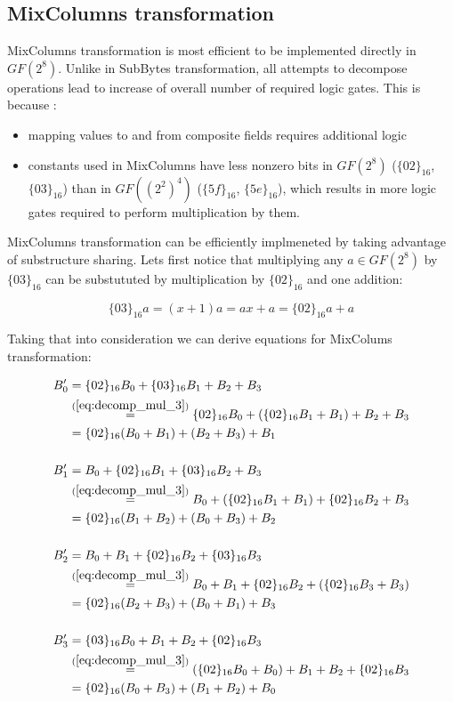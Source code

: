 \subsection{MixColumns transformation}

MixColumns transformation is most efficient to be implemented directly in $GF(2^8)$. Unlike in SubBytes transformation, all attempts to decompose operations lead to increase of overall number of required logic gates. This is because \cite{vlsi}:

\begin{itemize}[nolistsep]
\item mapping values to and from composite fields requires additional logic
\item constants used in MixColumns have less nonzero bits in $GF(2^8)$ ($\{02\}_{16}$, $\{03\}_{16}$) than in $GF((2^2)^4)$ ($\{5f\}_{16}$, $\{5e\}_{16}$), which results in more logic gates required to perform multiplication by them.
\end{itemize}

MixColumns transformation can be efficiently implmeneted by taking advantage of substructure sharing. Lets first notice that multiplying any $a \in GF(2^8)$ by $\{03\}_{16}$ can be substututed by multiplication by $\{02\}_{16}$ and one addition:

\begin{equation}
\label{eq:decomp_mul_3}
\{03\}_{16}a = (x + 1)a = ax + a = \{02\}_{16}a + a
\end{equation}

Taking that into consideration we can derive equations for MixColums transformation:

\begin{equation}
\label{xd}
\begin{aligned}
B_0' &= \{02\}_{16}B_0 + \{03\}_{16}B_1 + B_2 + B_3 \\
&\stackrel{(\ref{eq:decomp_mul_3})}{=}
\{02\}_{16}B_0 + (\{02\}_{16}B_1 + B_1) + B_2 + B_3 \\
&= \{02\}_{16}(B_0 + B_1) + (B_2 + B_3) + B_1 \\ \\
%
B_1' &= B_0 + \{02\}_{16}B_1 + \{03\}_{16}B_2 +  B_3 \\ 
&\stackrel{(\ref{eq:decomp_mul_3})}{=}
B_0 + (\{02\}_{16}B_1 + B_1) + \{02\}_{16}B_2 + B_3 \\ 
&= \{02\}_{16}(B_1 + B_2) + (B_0 + B_3) + B_2\\ \\
%
B_2' &= B_0 + B_1 + \{02\}_{16}B_2 + \{03\}_{16}B_3 \\
&\stackrel{(\ref{eq:decomp_mul_3})}{=}
B_0 + B_1 + \{02\}_{16}B_2 + (\{02\}_{16}B_3 + B_3) \\
&= \{02\}_{16}(B_2 + B_3) + (B_0 + B_1) + B_3 \\ \\
%
B_3' &= \{03\}_{16}B_0 + B_1 + B_2 + \{02\}_{16}B_3 \\
&\stackrel{(\ref{eq:decomp_mul_3})}{=}
(\{02\}_{16}B_0 + B_0) + B_1 + B_2 + \{02\}_{16}B_3 \\
&= \{02\}_{16}(B_0 + B_3) + (B_1 + B_2) + B_0
\end{aligned}
\end{equation}

